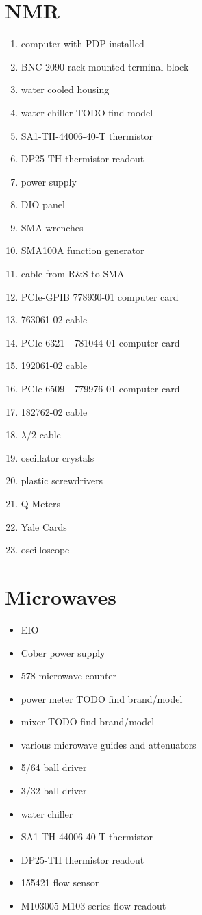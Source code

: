 \section{NMR}
\begin{enumerate}
\item computer with PDP installed
\item {} BNC-2090 rack mounted terminal block
\item water cooled housing
\item water chiller TODO find model
\item {} SA1-TH-44006-40-T thermistor
\item {} DP25-TH thermistor readout
\item power supply
\item DIO panel
 \item SMA wrenches
\item {}  SMA100A function generator
\item cable from R\&S to SMA
\item {} PCIe-GPIB 778930-01 computer card
\item {}763061-02 cable
\item {} PCIe-6321 - 781044-01 computer card
\item {} 192061-02 cable
\item {} PCIe-6509 - 779976-01 computer card
\item {} 182762-02 cable
\item $\lambda$/2 cable
\item oscillator crystals
\item plastic screwdrivers
\item Q-Meters
\item Yale Cards
\item oscilloscope
\end{enumerate}


\section{Microwaves}
\begin{itemize}
 \item EIO
\item Cober power supply
\item {} 578 microwave counter
\item power meter TODO find brand/model
\item mixer TODO find brand/model
\item various microwave guides and attenuators
\item 5/64\inches{} ball driver
\item 3/32\inches{} ball driver
\item water chiller
\item {} SA1-TH-44006-40-T thermistor
\item {} DP25-TH thermistor readout
\item {} 155421 flow sensor
\item {} M103005  M103 series flow readout
\end{itemize}
